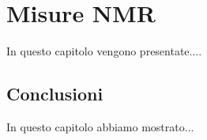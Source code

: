 \chapter{Misure NMR}
\minitoc
\textsf{In questo capitolo vengono presentate....}\\



\section{Conclusioni}
In questo capitolo abbiamo mostrato...






















